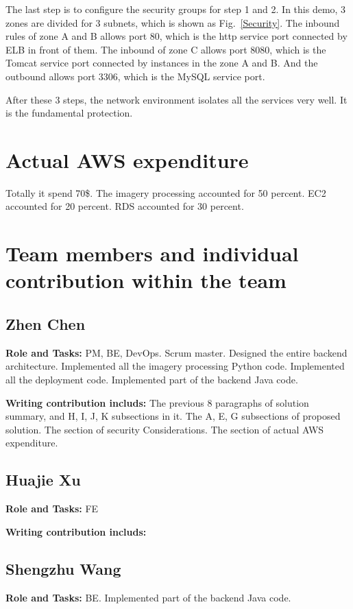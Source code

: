 \documentclass[conference]{IEEEtran}
\begin{document}
The last step is to configure the security groups for step 1 and 2. In this demo, 3 zones are divided for 3 subnets, which is shown as Fig.~\ref{Security}. The inbound 
rules of zone A and B allows port 80, which is the http service port connected by ELB in front of them. The inbound of zone C allows port 8080, which is the Tomcat 
service port connected by instances in the zone A and B. And the outbound allows port 3306, which is the MySQL service port.

After these 3 steps, the network environment isolates all the services very well. It is the fundamental protection.

\section{Actual AWS expenditure}

Totally it spend 70\$. The imagery processing accounted for 50 percent. EC2 accounted for 20 percent. RDS accounted for 30 percent.

\section{Team members and individual contribution within the team}

\subsection{Zhen Chen}
\textbf{Role and Tasks:} PM, BE, DevOps. Scrum master. Designed the entire backend architecture. 
    Implemented all the imagery processing Python code. Implemented all the deployment code. 
    Implemented part of the backend Java code. 

\textbf{Writing contribution includs:} The previous 8 paragraphs of solution summary, and H, I, J, 
    K subsections in it. The A, E, G subsections of proposed solution. The section of security 
    Considerations. The section of actual AWS expenditure.

\subsection{Huajie Xu} 
\textbf{Role and Tasks:} FE

\textbf{Writing contribution includs:} 

\subsection{Shengzhu Wang}
\textbf{Role and Tasks:} BE. Implemented part of the backend Java code. 
 
\end{document}
